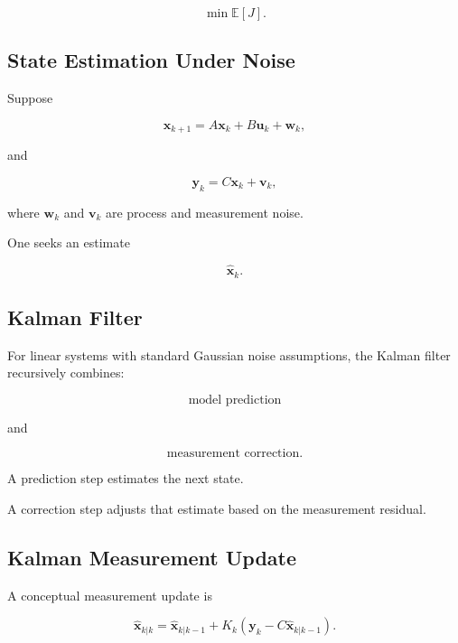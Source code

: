 \[
\boxed{
\min
\mathbb{E}[J].
}
\]

\subsection{State Estimation Under Noise}
\label{subsec:state-estimation-noise}

Suppose

\[
\boxed{
\mathbf{x}_{k+1}
=
A\mathbf{x}_k
+
B\mathbf{u}_k
+
\mathbf{w}_k,
}
\]

and

\[
\boxed{
\mathbf{y}_k
=
C\mathbf{x}_k
+
\mathbf{v}_k,
}
\]

where \(\mathbf{w}_k\) and \(\mathbf{v}_k\) are process and measurement
noise.

One seeks an estimate

\[
\boxed{
\hat{\mathbf{x}}_k.
}
\]

\subsection{Kalman Filter}
\label{subsec:kalman-filter}

For linear systems with standard Gaussian noise assumptions, the Kalman
filter recursively combines:

\[
\boxed{
\text{model prediction}
}
\]

and

\[
\boxed{
\text{measurement correction}.
}
\]

A prediction step estimates the next state.

A correction step adjusts that estimate based on the measurement residual.

\subsection{Kalman Measurement Update}
\label{subsec:kalman-measurement-update}

A conceptual measurement update is

\[
\boxed{
\hat{\mathbf{x}}_{k|k}
=
\hat{\mathbf{x}}_{k|k-1}
+
K_k
\left(
\mathbf{y}_k
-
C\hat{\mathbf{x}}_{k|k-1}
\right).
}
\]

